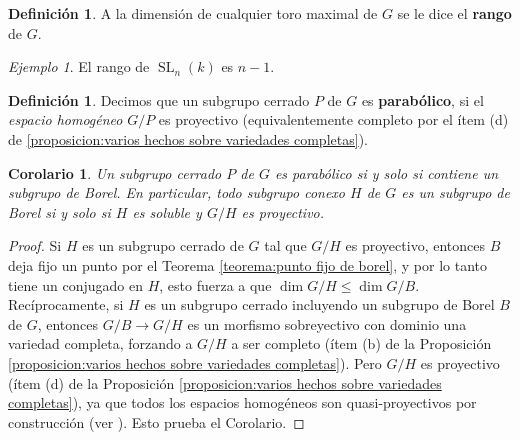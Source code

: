 \documentclass[spanish,10pt]{amsart}
\newtheorem{corollary}[theorem]{Corolario}
\theoremstyle{definition}
\newtheorem{definition}[theorem]{Definición}
\theoremstyle{remark}
\newtheorem{example}[theorem]{Ejemplo}
\numberwithin{equation}{section}
\begin{document}
\begin{definition}
A la dimensión de cualquier toro maximal de $G$ se le dice el \textbf{rango} de $G$.
\end{definition}

\begin{example}
El rango de $\operatorname{SL}_n (k)$ es $n-1$.
\end{example}

\begin{definition}
Decimos que un subgrupo cerrado $P$ de $G$ es \textbf{parabólico}, si el \textit{espacio homogéneo} $G/P$ es proyectivo (equivalentemente completo por el ítem (d) de \ref{proposicion:varios hechos sobre variedades completas}).
\end{definition}

\begin{corollary}\label{corolario:un subgrupo cerrado es parabolico si y solo si incluye un subgrupo de borel}
Un subgrupo cerrado $P$ de $G$ es parabólico si y solo si contiene un subgrupo de Borel. En particular, todo subgrupo conexo $H$ de $G$ es un subgrupo de Borel si y solo si $H$ es soluble y $G/H$ es proyectivo.
\end{corollary}
\begin{proof}
Si $H$ es un subgrupo cerrado de $G$ tal que $G/H$ es proyectivo, entonces $B$ deja fijo un punto por el Teorema \ref{teorema:punto fijo de borel}, y por lo tanto tiene un conjugado en $H$, esto fuerza a que $\dim G/H \leq \dim G/B$. Recíprocamente, si $H$ es un subgrupo cerrado incluyendo un subgrupo de Borel $B$ de $G$, entonces $G/B \to G/H$ es un morfismo sobreyectivo con dominio una variedad completa, forzando a $G/H$ a ser completo (ítem (b) de la Proposición \ref{proposicion:varios hechos sobre variedades completas}). Pero $G/H$ es proyectivo (ítem (d) de la Proposición \ref{proposicion:varios hechos sobre variedades completas}), ya que todos los espacios homogéneos son quasi-proyectivos por construcción (ver \cite[\S 11.3]{humphreys2012linearAlgebraicGroups}). Esto prueba el Corolario.
\end{proof}
\end{document}
